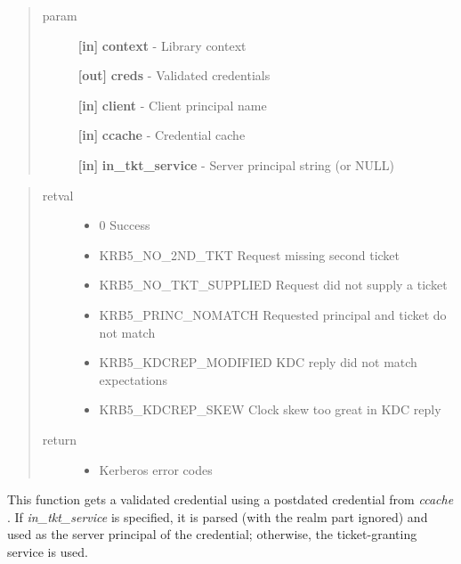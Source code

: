 \documentclass[letterpaper,10pt,english]{sphinxmanual}
\begin{document}
\begin{quote}\begin{description}
\item[{param}] \leavevmode
\textbf{{[}in{]}} \textbf{context} - Library context

\textbf{{[}out{]}} \textbf{creds} - Validated credentials

\textbf{{[}in{]}} \textbf{client} - Client principal name

\textbf{{[}in{]}} \textbf{ccache} - Credential cache

\textbf{{[}in{]}} \textbf{in\_tkt\_service} - Server principal string (or NULL)

\end{description}\end{quote}
\begin{quote}\begin{description}
\item[{retval}] \leavevmode\begin{itemize}
\item {} 
0   Success

\item {} 
KRB5\_NO\_2ND\_TKT   Request missing second ticket

\item {} 
KRB5\_NO\_TKT\_SUPPLIED   Request did not supply a ticket

\item {} 
KRB5\_PRINC\_NOMATCH   Requested principal and ticket do not match

\item {} 
KRB5\_KDCREP\_MODIFIED   KDC reply did not match expectations

\item {} 
KRB5\_KDCREP\_SKEW   Clock skew too great in KDC reply

\end{itemize}

\item[{return}] \leavevmode\begin{itemize}
\item {} 
Kerberos error codes

\end{itemize}

\end{description}\end{quote}

This function gets a validated credential using a postdated credential from \emph{ccache} . If \emph{in\_tkt\_service} is specified, it is parsed (with the realm part ignored) and used as the server principal of the credential; otherwise, the ticket-granting service is used.
\end{document}
